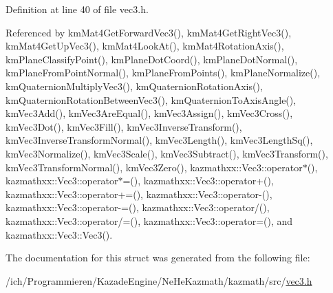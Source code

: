 Definition at line 40 of file vec3.h.

Referenced by kmMat4GetForwardVec3(), kmMat4GetRightVec3(), kmMat4GetUpVec3(), kmMat4LookAt(), kmMat4RotationAxis(), kmPlaneClassifyPoint(), kmPlaneDotCoord(), kmPlaneDotNormal(), kmPlaneFromPointNormal(), kmPlaneFromPoints(), kmPlaneNormalize(), kmQuaternionMultiplyVec3(), kmQuaternionRotationAxis(), kmQuaternionRotationBetweenVec3(), kmQuaternionToAxisAngle(), kmVec3Add(), kmVec3AreEqual(), kmVec3Assign(), kmVec3Cross(), kmVec3Dot(), kmVec3Fill(), kmVec3InverseTransform(), kmVec3InverseTransformNormal(), kmVec3Length(), kmVec3LengthSq(), kmVec3Normalize(), kmVec3Scale(), kmVec3Subtract(), kmVec3Transform(), kmVec3TransformNormal(), kmVec3Zero(), kazmathxx::Vec3::operator$\ast$(), kazmathxx::Vec3::operator$\ast$=(), kazmathxx::Vec3::operator+(), kazmathxx::Vec3::operator+=(), kazmathxx::Vec3::operator-(), kazmathxx::Vec3::operator-=(), kazmathxx::Vec3::operator/(), kazmathxx::Vec3::operator/=(), kazmathxx::Vec3::operator=(), and kazmathxx::Vec3::Vec3().

The documentation for this struct was generated from the following file:\begin{CompactItemize}
\item 
/ich/Programmieren/KazadeEngine/NeHeKazmath/kazmath/src/\hyperlink{vec3_8h}{vec3.h}\end{CompactItemize}
